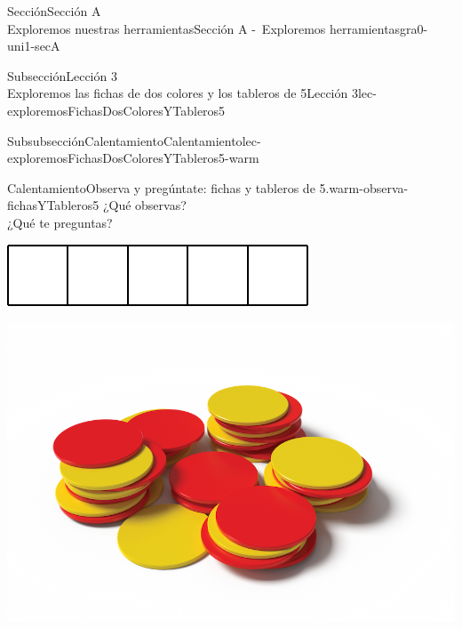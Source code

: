 \begin{sectionptx}{Sección}{{\Large Sección A\\}Exploremos nuestras herramientas}{}{Sección A -~Exploremos herramientas}{}{}{gra0-uni1-secA}
\begin{subsectionptx}{Subsección}{{\normalsize Lección 3\\[-0.05cm]}Exploremos las fichas de dos colores y los tableros de 5}{}{Lección 3}{}{}{lec-exploremosFichasDosColoresYTableros5}
%
\begin{subsubsectionptx}{Subsubsección}{Calentamiento}{}{Calentamiento}{}{}{lec-exploremosFichasDosColoresYTableros5-warm}
\begin{exploration}{Calentamiento}{Observa y pregúntate: fichas y tableros de 5.}{warm-observa-fichasYTableros5}%
¿Qué observas?\\
 ¿Qué te preguntas?%
\begin{sidebyside}{2}{0.05}{0.05}{0.1}%
\begin{sbspanel}{0.4}%
\includegraphics[max width=\linewidth, center]{external/svg-source/tikz-file-147345.pdf}
\end{sbspanel}%
\begin{sbspanel}{0.4}%
\includegraphics[max width=\linewidth, center]{external/png-source/K.1.A Beta Student Workbook.RedYellowChips_withShadow.png}
\end{sbspanel}%
\end{sidebyside}%
\begin{sidebyside}{2}{0.05}{0.05}{0.1}%
\begin{sbspanel}{0.4}%

\end{sbspanel}
\end{sidebyside}
\end{exploration}
\end{subsubsectionptx}
\end{subsectionptx}
\end{sectionptx}
